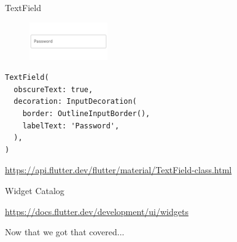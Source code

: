 \begin{frame}[containsverbatim]{TextField}

  \begin{figure}[h]
    \includegraphics[width=0.3\textwidth]{images/text_field.png}
  \end{figure}

  \begin{verbatim}
TextField(
  obscureText: true,
  decoration: InputDecoration(
    border: OutlineInputBorder(),
    labelText: 'Password',
  ),
)
	\end{verbatim}
  \footnotesize
  \url{https://api.flutter.dev/flutter/material/TextField-class.html}
\end{frame}

\begin{frame}{Widget Catalog}

  \url{https://docs.flutter.dev/development/ui/widgets}
\end{frame}

\begin{frame}
  Now that we got that covered...
\end{frame}